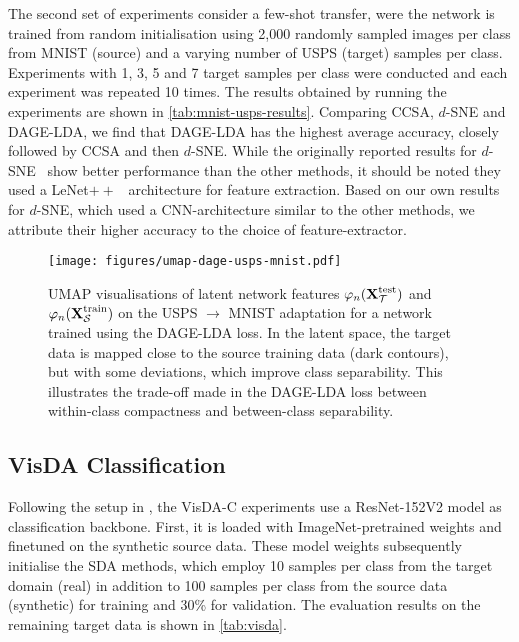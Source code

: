 \documentclass[journal]{IEEEtran}
\renewcommand{\matrix}[1]{\ensuremath{\bm{\mathbf{\uppercase{#1}}}}}
\newcommand{\Src}{\mathcal{S}} \newcommand{\Tgt}{\mathcal{T}}
\begin{document}
The second set of experiments consider a few-shot transfer, were the network is trained from random initialisation using 2,000 randomly sampled images per class from MNIST (source) and a varying number of USPS (target) samples per class. Experiments with 1, 3, 5 and 7 target samples per class were conducted and each experiment was repeated 10 times.
The results obtained by running the experiments are shown in \cref{tab:mnist-usps-results}. Comparing CCSA, $d$-SNE and DAGE-LDA, we find that DAGE-LDA has the highest average accuracy, closely followed by CCSA and then $d$-SNE. 
While the originally reported results for $d$-SNE~\cite{xu2019dsne} show better performance than the other methods, it should be noted they used a LeNet$++$~\cite{wen2016conv} architecture for feature extraction. Based on our own results for $d$-SNE, which used a CNN-architecture similar to the other methods, we attribute their higher accuracy to the choice of feature-extractor.


\begin{figure}
    \centering
    \texttt{[image: figures/umap-dage-usps-mnist.pdf]}
    \caption{
        UMAP visualisations of latent network features $\varphi_{n}(\matrix{X}_\Tgt^{\text{test}})$ and $\varphi_{n}(\matrix{X}_\Src^{\text{train}})$ on the USPS $\rightarrow$ MNIST adaptation for a network trained using the DAGE-LDA loss.
        In the latent space, the target data is mapped close to the source training data (dark contours), but with some deviations, which improve class separability. This illustrates the trade-off made in the DAGE-LDA loss between within-class compactness and between-class separability.
    }
    \label{fig:dage-features}
\end{figure}


\subsection{VisDA Classification}

Following the setup in \cite{xu2019dsne}, the VisDA-C experiments use a ResNet-152V2 model as classification backbone. First, it is loaded with ImageNet-pretrained weights and finetuned on the synthetic source data. These model weights subsequently initialise the SDA methods, which employ 10 samples per class from the target domain (real) in addition to 100 samples per class from the source data (synthetic) for training and 30\% for validation. The evaluation results on the remaining target data is shown in \cref{tab:visda}.
\end{document}
